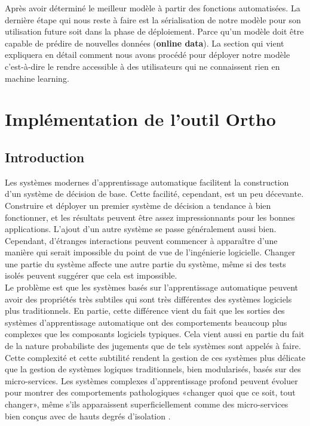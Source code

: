 \documentclass[12pt, french]{report}
\begin{document}
Après avoir déterminé le meilleur modèle à partir des fonctions automatisées. La dernière étape qui nous reste à faire est la sérialisation de notre modèle pour son utilisation future soit dans la phase de déploiement. Parce qu'un modèle doit être capable de prédire de nouvelles données (\textbf{online data}). La section qui vient expliquera en détail comment nous avons procédé pour déployer notre modèle c'est-à-dire le rendre accessible à des utilisateurs qui ne connaissent rien en machine learning.  \\ 



 

\chapter{Implémentation de l'outil Ortho}
\section{Introduction}

Les systèmes modernes d'apprentissage automatique facilitent la construction d'un système de décision de base. Cette facilité, cependant, est un peu décevante. Construire et déployer un premier système de décision a tendance à bien fonctionner, et les résultats peuvent être assez impressionnants pour les bonnes applications. L'ajout d'un autre système se passe généralement aussi bien. Cependant, d'étranges interactions peuvent commencer à apparaître d'une manière qui serait impossible du point de vue de l'ingénierie logicielle. Changer une partie du système affecte une autre partie du système, même si des tests isolés peuvent suggérer que cela est impossible. \\

Le problème est que les systèmes basés sur l'apprentissage automatique peuvent avoir des propriétés très subtiles qui sont très différentes des systèmes logiciels plus traditionnels. En partie, cette différence vient du fait que les sorties des systèmes d'apprentissage automatique ont des comportements beaucoup plus complexes que les composants logiciels typiques. Cela vient aussi en partie du fait de la nature probabiliste des jugements que de tels systèmes sont appelés à faire. \\

Cette complexité et cette subtilité rendent la gestion de ces systèmes plus délicate que la gestion de systèmes logiques traditionnels, bien modularisés, basés sur des micro-services. Les systèmes complexes d'apprentissage profond peuvent évoluer pour montrer des comportements pathologiques «changer quoi que ce soit, tout changer», même s'ils apparaissent superficiellement comme des micro-services bien conçus avec de hauts degrés d'isolation \cite{key7}.\\
\end{document}
